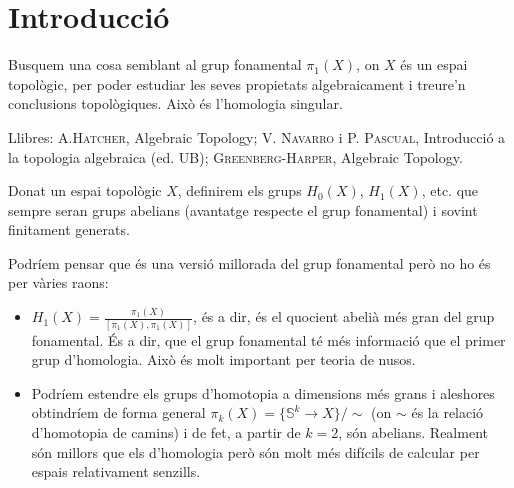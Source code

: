 \documentclass[../main.tex]{subfiles}
\begin{document}
\section*{Introducció}

Busquem una cosa semblant al grup fonamental $\pi_1(X)$, on $X$ és un espai topològic, per poder estudiar les seves propietats algebraicament i treure'n conclusions topològiques. Això és l'homologia singular.

Llibres: \textsc{A.Hatcher}, Algebraic Topology; \textsc{V. Navarro} i \textsc{P. Pascual}, Introducció a la topologia algebraica (ed. UB); \textsc{Greenberg-Harper}, Algebraic Topology.

Donat un espai topològic $X$, definirem els grups $H_0(X)$, $H_1(X)$, etc. que sempre seran grups abelians (avantatge respecte el grup fonamental) i sovint finitament generats.

Podríem pensar que és una versió millorada del grup fonamental però no ho és per vàries raons:
\begin{itemize}
    \item $H_1(X) = \frac{\pi_1(X)}{[\pi_1(X),\pi_1(X)]}$, és a dir, és el quocient abelià més gran del grup fonamental. És a dir, que el grup fonamental té més informació que el primer grup d'homologia. Això és molt important per teoria de nusos.
    \item Podríem estendre els grups d'homotopia a dimensions més grans i aleshores obtindríem de forma general $\pi_k(X) = \{\mathbb{S}^k\rightarrow X\}/\sim$ (on $\sim$ és la relació d'homotopia de camins) i de fet, a partir de $k =2$, són abelians. Realment són millors que els d'homologia però són molt més difícils de calcular per espais relativament senzills.
\end{itemize}








\end{document}
